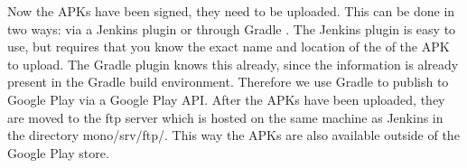 Now the APKs have been signed, they need to be uploaded. This can be done in two ways: via a Jenkins plugin \parencite{jenkins-play-plugin} or through Gradle \parencite{gradle-play-plugin}. The Jenkins plugin is easy to use, but requires that you know the exact name and location of the of the APK to upload. The Gradle plugin knows this already, since the information is already present in the Gradle build environment. Therefore we use Gradle to publish to Google Play via a Google Play API\@. After the APKs have been uploaded, they are moved to the ftp server which is hosted on the same machine as Jenkins in the directory mono{/srv/ftp/}. This way the APKs are also available outside of the Google Play store.